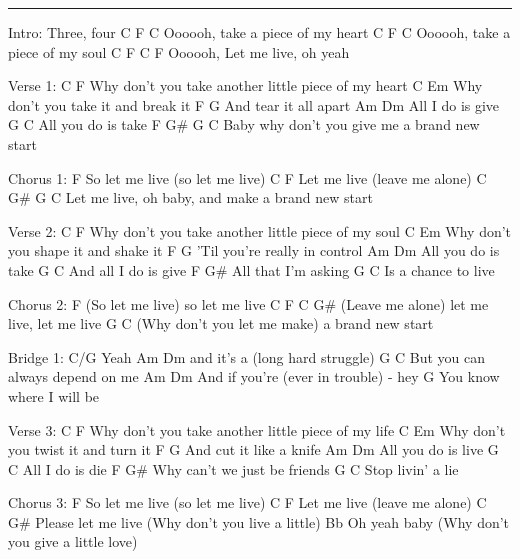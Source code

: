 \noindent\rule{\columnwidth}{1pt}
\begin{multicols}{2}
\begin{lstsong}
Intro:
Three, four
C    F                     C
Oooooh, take a piece of my heart 
C    F                     C
Oooooh, take a piece of my soul 
C    F          C        F
Oooooh, Let me live, oh yeah 

Verse 1:
              C                             F
Why don't you take another little piece of my heart 
              C           Em
Why don't you take it and break it 
    F           G
And tear it all apart 
Am           Dm
All I do is give 
G             C
All you do is take 
F        G#                  G         C
Baby why don't you give me a brand new start

Chorus 1:
          F
So let me live (so let me live) 
C      F
Let me live (leave me alone) 
C      G#                        G         C
Let me live, oh baby, and make a brand new start 

Verse 2:
              C                            F
Why don't you take another little piece of my soul 
              C              Em
Why don't you shape it and shake it 
      F                    G
'Til you're really in control 
Am            Dm
All you do is take 
    G            C
And all I do is give 
F            G#
All that I'm asking 
     G         C
Is a chance to live




Chorus 2:
            F
(So let me live) so let me live 
 C          F                 C      G#
(Leave me alone) let me live, let me live 
                              G         C
(Why don't you let me make) a brand new start

Bridge 1:
C/G
Yeah 
            Am        Dm
and it's a (long hard struggle)
            G                C 
But you can always depend on me 
               Am       Dm
And if you're (ever in trouble) - hey 
    G
You know where I will be

Verse 3:
              C                             F
Why don't you take another little piece of my life 
              C            Em
Why don't you twist it and turn it 
    F              G
And cut it like a knife 
Am            Dm
All you do is live 
G           C
All I do is die 
F            G# 
Why can't we just be friends 
     G        C
Stop livin' a lie 

Chorus 3:
          F
So let me live (so let me live) 
C      F
Let me live (leave me alone) 
  C           G#
Please let me live (Why don't you live a little) 
         Bb
Oh yeah baby (Why don't you give a little love) 





\end{lstsong}
\end{multicols}
